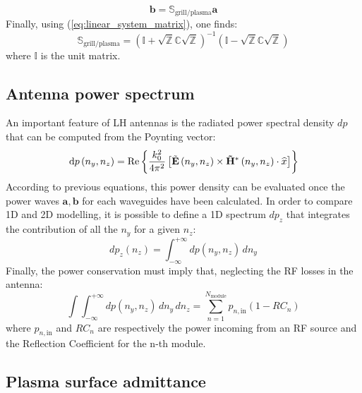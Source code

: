 \begin{equation}
\mathbf{b}=\mathbb{S}_{\mbox{grill/plasma}}\mathbf{a}\label{eq:Sgrillplasma_def}
\end{equation}
Finally, using (\ref{eq:linear_system_matrix}), one finds:
\begin{equation}
\mathbb{S}_{\mbox{grill/plasma}}=\left(\mathbb{I}+\sqrt{\mathbb{Z}}\mathbb{C}\sqrt{\mathbb{Z}}\right)^{-1}\left(\mathbb{I}-\sqrt{\mathbb{Z}}\mathbb{C}\sqrt{\mathbb{Z}}\right)
\end{equation}
where $\mathbb{I}$ is the unit matrix.

\subsection{Antenna power spectrum}
An important feature of LH antennas is the radiated power spectral density $dp$ that can be computed from the Poynting vector: 
\begin{equation} 
{\mathrm{d}} p
\left(n_{y},n_{z}\right)
=\Re\left\{ \frac{k_{0}^{2}}{4\pi^{2}}\left[\tilde{\mathbf{E}}\left(n_{y},n_{z}\right)\times\mathbf{\tilde{H}^{*}}\left(n_{y},n_{z}\right)\cdot\widehat{x}\right]\right\} 
\label{eq:power_spectrum_2D}
\end{equation}
According to previous equations, this power density can be evaluated once the power waves $\mathbf{a},\mathbf{b}$ for each waveguides have been calculated. In order to compare 1D and 2D modelling, it is possible to define a 1D spectrum $dp_{z}$ that integrates the contribution of all the $n_{y}$ for a given $n_{z}$:
\begin{equation}
dp_{z}\left(n_{z}\right)=\int_{-\infty}^{+\infty}\! dp\left(n_{y},n_{z}\right)\, dn_{y}\label{eq:power_spectrum_1D}
\end{equation}
Finally, the power conservation must imply that, neglecting the RF
losses in the antenna:
\begin{equation}
\int\int_{-\infty}^{+\infty}\! dp\left(n_{y},n_{z}\right)\, dn_{y}\, dn_{z}=\sum_{n=1}^{N_{\mbox{module}}}p_{n,\mbox{in}}\left(1-RC_{n}\right)\label{eq:spectrum_power_conservation}
\end{equation}
where $p_{n,\mbox{in}}$ and $RC_{n}$ are respectively the power incoming from an RF source and the Reflection Coefficient for the n-th module. 


\subsection{Plasma surface admittance}\label{sec:surface_admittance}

